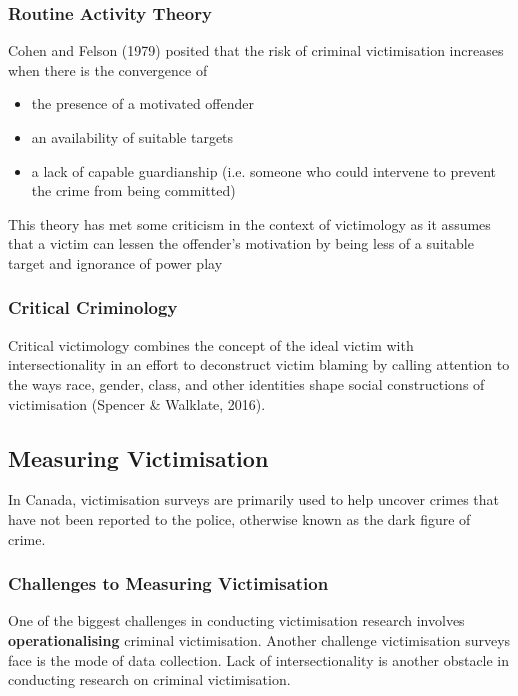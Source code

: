 \documentclass{article}
\begin{document}
\subsubsection*{Routine Activity Theory}

Cohen and Felson (1979) posited that the risk of criminal victimisation increases when there is the convergence of 

\begin{itemize}
    \item the presence of a motivated offender
    \item an availability of suitable targets
    \item a lack of capable guardianship (i.e. someone who could intervene to prevent the crime from being committed)
\end{itemize}

This theory has met some criticism in the context of victimology as it assumes that a victim can lessen the offender’s motivation by being less of a suitable target and ignorance of power play

\subsubsection*{Critical Criminology}

Critical victimology combines the concept of the ideal victim with intersectionality in an effort to deconstruct victim blaming by calling attention to the ways race, gender, class, and other identities shape social constructions of victimisation (Spencer \& Walklate, 2016).

\subsection{Measuring Victimisation}

In Canada, victimisation surveys are primarily used to help uncover crimes that have not been reported to the police, otherwise known as the dark figure of crime.

\subsubsection*{Challenges to Measuring Victimisation}

One of the biggest challenges in conducting victimisation research involves \textbf{operationalising} criminal victimisation. Another challenge victimisation surveys face is the mode of data collection. Lack of intersectionality is another obstacle in conducting research on criminal victimisation. 
\end{document}
